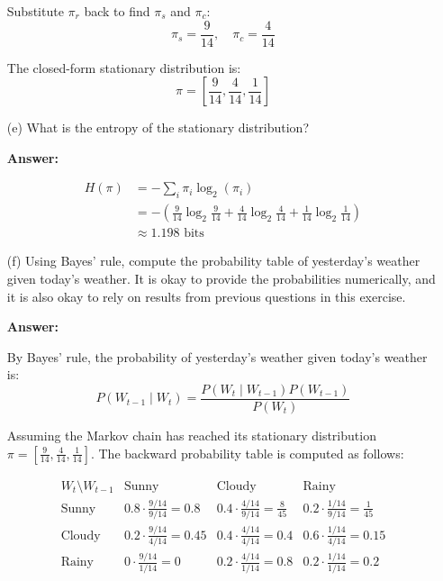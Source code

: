 \documentclass{article}
\begin{document}
\begin{enumerate}
    Substitute $\pi_r$ back to find $\pi_s$ and $\pi_c$:
    $$ \pi_s = \frac{9}{14}, \quad \pi_c = \frac{4}{14} $$

    The closed-form stationary distribution is:
    $$ \pi = \left[ \frac{9}{14}, \frac{4}{14}, \frac{1}{14} \right] $$

    \item[(e)] What is the entropy of the stationary distribution?

    \textbf{Answer:}

    $$
    \begin{aligned}
    H(\pi) &= -\sum_{i} \pi_i \log_2(\pi_i) \\
    &= - \left( \frac{9}{14} \log_2 \frac{9}{14} + \frac{4}{14} \log_2 \frac{4}{14} + \frac{1}{14} \log_2 \frac{1}{14} \right) \\
    &\approx 1.198 \text{ bits}
    \end{aligned}
    $$

    \item[(f)] Using Bayes' rule, compute the probability table of yesterday’s weather given today’s weather. It is okay to provide the probabilities numerically, and it is also okay to rely on results from previous questions in this exercise.

    \textbf{Answer:}

    By Bayes' rule, the probability of yesterday's weather given today's weather is:
    $$
    P(W_{t-1} \mid W_t) = \frac{P(W_t \mid W_{t-1}) P(W_{t-1})}{P(W_t)}
    $$

    Assuming the Markov chain has reached its stationary distribution $\pi = \left[ \frac{9}{14}, \frac{4}{14}, \frac{1}{14} \right]$. The backward probability table is computed as follows:

    $$
    \begin{array}{c|ccc}
    W_t \setminus W_{t-1} & \text{Sunny} & \text{Cloudy} & \text{Rainy} \\
    \hline
    \text{Sunny} & 0.8 \cdot \frac{9/14}{9/14} = 0.8 & 0.4 \cdot \frac{4/14}{9/14} = \frac{8}{45} & 0.2 \cdot \frac{1/14}{9/14} = \frac{1}{45} \\[8pt]
    \text{Cloudy} & 0.2 \cdot \frac{9/14}{4/14} = 0.45 & 0.4 \cdot \frac{4/14}{4/14} = 0.4 & 0.6 \cdot \frac{1/14}{4/14} = 0.15 \\[8pt]
    \text{Rainy} & 0 \cdot \frac{9/14}{1/14} = 0 & 0.2 \cdot \frac{4/14}{1/14} = 0.8 & 0.2 \cdot \frac{1/14}{1/14} = 0.2
    \end{array}
    $$


\end{enumerate}
\end{document}
